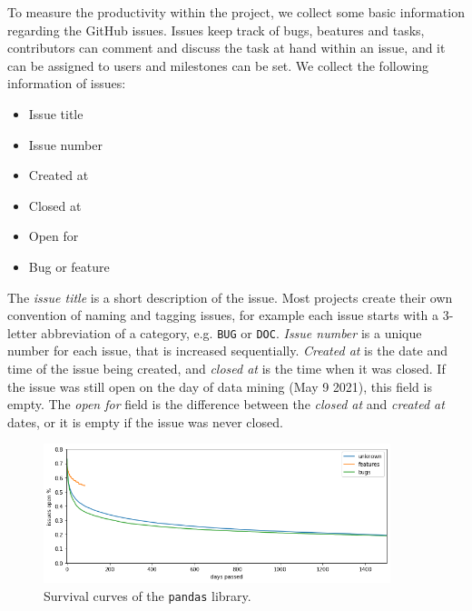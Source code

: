 To measure the productivity within the project, we collect some basic information regarding the GitHub issues. Issues keep track of bugs, beatures and tasks, contributors can comment and discuss the task at hand within an issue, and it can be assigned to users and milestones can be set. We collect the following information of issues:

\begin{itemize}
    \item Issue title
    \item Issue number
    \item Created at
    \item Closed at
    \item Open for
    \item Bug or feature
\end{itemize}

The \textit{issue title} is a short description of the issue. Most projects create their own convention of naming and tagging issues, for example each issue starts with a 3-letter abbreviation of a category, e.g. \texttt{BUG} or \texttt{DOC}. \textit{Issue number} is a unique number for each issue, that is increased sequentially. \textit{Created at} is the date and time of the issue being created, and \textit{closed at} is the time when it was closed. If the issue was still open on the day of data mining (May 9 2021), this field is empty. The \textit{open for} field is the difference between the \textit{closed at} and \textit{created at} dates, or it is empty if the issue was never closed. \\

\begin{figure}
    \centering
    \includegraphics[width=0.9\textwidth]{figures/issues_open.png}
    \caption{Survival curves of the \texttt{pandas} library.}
    \label{fig:survival}
\end{figure}

